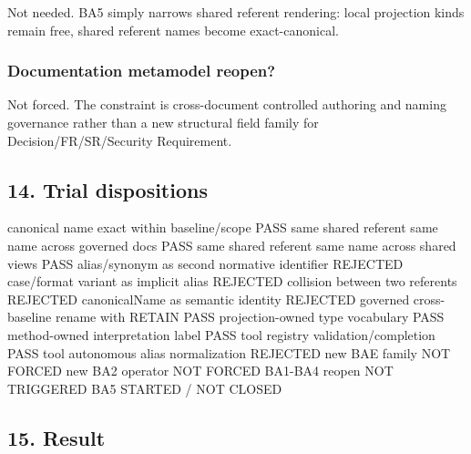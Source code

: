 \documentclass[
  10pt,
  a4paper,
]{article}
\newenvironment{Shaded}{}{}
\newcommand{\NormalTok}[1]{#1}
\begin{document}
Not needed. BA5 simply narrows shared referent rendering: local
projection kinds remain free, shared referent names become
exact-canonical.

\subsubsection{Documentation metamodel
reopen?}\label{documentation-metamodel-reopen}

Not forced. The constraint is cross-document controlled authoring and
naming governance rather than a new structural field family for
Decision/FR/SR/Security Requirement.

\subsection{14. Trial dispositions}\label{trial-dispositions}

\begin{Shaded}
\begin{Highlighting}[]
\NormalTok{canonical name exact within baseline/scope                 PASS}
\NormalTok{same shared referent same name across governed docs        PASS}
\NormalTok{same shared referent same name across shared views         PASS}
\NormalTok{alias/synonym as second normative identifier               REJECTED}
\NormalTok{case/format variant as implicit alias                      REJECTED}
\NormalTok{collision between two referents                            REJECTED}
\NormalTok{canonicalName as semantic identity                         REJECTED}
\NormalTok{governed cross{-}baseline rename with RETAIN                 PASS}
\NormalTok{projection{-}owned type vocabulary                           PASS}
\NormalTok{method{-}owned interpretation label                          PASS}
\NormalTok{tool registry validation/completion                        PASS}
\NormalTok{tool autonomous alias normalization                        REJECTED}
\NormalTok{new BAE family                                             NOT FORCED}
\NormalTok{new BA2 operator                                           NOT FORCED}
\NormalTok{BA1{-}BA4 reopen                                             NOT TRIGGERED}
\NormalTok{BA5                                                        STARTED / NOT CLOSED}
\end{Highlighting}
\end{Shaded}

\subsection{15. Result}\label{result}
\end{document}

